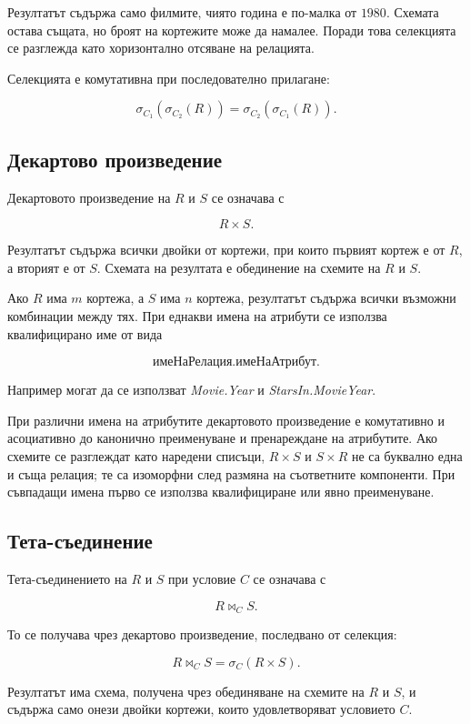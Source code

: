 Резултатът съдържа само филмите, чиято година е по-малка от $1980$. Схемата остава същата, но броят на кортежите може да намалее. Поради това селекцията се разглежда като хоризонтално отсяване на релацията.

Селекцията е комутативна при последователно прилагане:

\[
\sigma_{C_1}(\sigma_{C_2}(R))
=
\sigma_{C_2}(\sigma_{C_1}(R)).
\]

\subsection{Декартово произведение}\label{s:23.4.6}

Декартовото произведение на $R$ и $S$ се означава с

\[
R\times S.
\]

Резултатът съдържа всички двойки от кортежи, при които първият кортеж е от $R$, а вторият е от $S$. Схемата на резултата е обединение на схемите на $R$ и $S$.

Ако $R$ има $m$ кортежа, а $S$ има $n$ кортежа, резултатът съдържа всички възможни комбинации между тях. При еднакви имена на атрибути се използва квалифицирано име от вида

\[
\textit{имеНаРелация}.\textit{имеНаАтрибут}.
\]

Например могат да се използват \textit{Movie.Year} и \textit{StarsIn.MovieYear}.

При различни имена на атрибутите декартовото произведение е комутативно и асоциативно до канонично преименуване и пренареждане на атрибутите. Ако схемите се разглеждат като наредени списъци, $R\times S$ и $S\times R$ не са буквално една и съща релация; те са изоморфни след размяна на съответните компоненти. При съвпадащи имена първо се използва квалифициране или явно преименуване.

\subsection{Тета-съединение}\label{s:23.4.7}

Тета-съединението на $R$ и $S$ при условие $C$ се означава с

\[
R\bowtie_C S.
\]

То се получава чрез декартово произведение, последвано от селекция:

\[
R\bowtie_C S=\sigma_C(R\times S).
\]

Резултатът има схема, получена чрез обединяване на схемите на $R$ и $S$, и съдържа само онези двойки кортежи, които удовлетворяват условието $C$.

